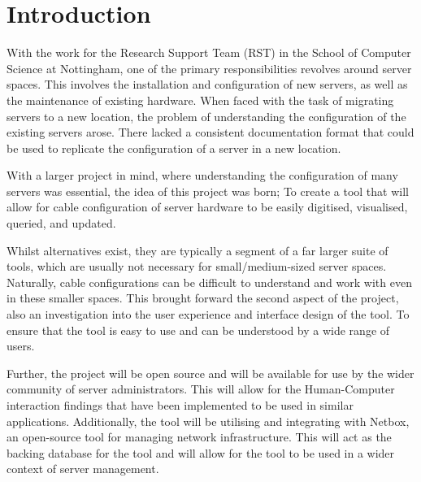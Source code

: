 \documentclass [11pt,a4paper]{article}
\begin{document}
\pagebreak

\tableofcontents
\pagebreak 
{}    

\setlength{\parskip}{2ex}

\section{Introduction}
\label{sec:introduction}
With the work for the Research Support Team (RST) in the School of Computer Science at Nottingham, one of the primary responsibilities revolves around server spaces. This involves the installation and configuration of new servers, as well as the maintenance of existing hardware. When faced with the task of migrating servers to a new location, the problem of understanding the configuration of the existing servers arose. There lacked a consistent documentation format that could be used to replicate the configuration of a server in a new location.

With a larger project in mind, where understanding the configuration of many servers was essential, the idea of this project was born; To create a tool that will allow for cable configuration of server hardware to be easily digitised, visualised, queried, and updated.

Whilst alternatives exist, they are typically a segment of a far larger suite of tools, which are usually not necessary for small/medium-sized server spaces. Naturally, cable configurations can be difficult to understand and work with even in these smaller spaces. This brought forward the second aspect of the project, also an investigation into the user experience and interface design of the tool. To ensure that the tool is easy to use and can be understood by a wide range of users.

Further, the project will be open source and will be available for use by the wider community of server administrators. This will allow for the Human-Computer interaction findings that have been implemented to be used in similar applications. Additionally, the tool will be utilising and integrating with Netbox\cite{Netbox}, an open-source tool for managing network infrastructure. This will act as the backing database for the tool and will allow for the tool to be used in a wider context of server management.
\end{document}
